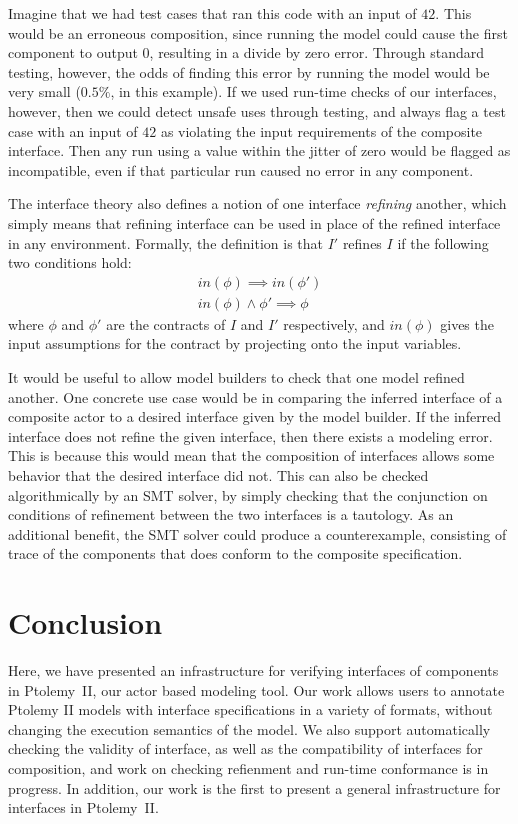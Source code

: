 \documentclass[preprint,11pt]{sigplanconf}
\begin{document}
Imagine that we had test cases that ran this code with an input of $42$.
This would be an erroneous composition, since running the model could cause
the first component to output $0$, resulting in a divide by zero error.
Through standard testing, however, the odds of finding this error by running
the model would be very small ($0.5\%$, in this example). If we used run-time
checks of our interfaces, however, then we could detect unsafe uses through
testing, and always flag a test case with an input of $42$ as violating the
input requirements of the composite interface. Then any run using a value
within the jitter of zero would be flagged as incompatible, even if that
particular run caused no error in any component.

The interface theory also defines a notion of one interface \emph{refining}
another, which simply means that refining interface can be used in place of the
refined interface in any environment.
Formally, the definition is that $I'$ refines $I$ if the following two
conditions hold:
\begin{align*}
in(\phi) \implies in(\phi') \\
in(\phi) \wedge \phi' \implies \phi
\end{align*}
where $\phi$ and $\phi'$ are the contracts of $I$ and $I'$ respectively, and
$in(\phi)$ gives the input assumptions for the contract by projecting onto the
input variables.

It would be useful to allow model builders to check that one model
refined another.  One concrete use case would be in comparing the
inferred interface of a composite actor to a desired interface given by the
model builder.  If the inferred interface does not refine the given interface,
then there exists a modeling error.  This is because this would mean that the
composition of interfaces allows some behavior that the desired interface did
not.
%
This can also be checked algorithmically by an SMT solver, by simply checking
that the conjunction on conditions of refinement between the two interfaces is
a tautology.  As an additional benefit, the SMT solver could produce a
counterexample, consisting of trace of the components that does conform to the
composite specification.

\section{Conclusion}
Here, we have presented an infrastructure for verifying interfaces of
components in Ptolemy~II, our actor based modeling tool. Our work
allows users to annotate Ptolemy II models with interface specifications in a
variety of formats, without changing the execution semantics of the model.
We also support automatically checking the validity of interface, as well as the
compatibility of interfaces for composition, and work on checking refienment
and run-time conformance is in progress. In addition, our work is the first to
present a general infrastructure for interfaces in Ptolemy~II.
\end{document}
